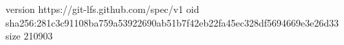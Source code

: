 version https://git-lfs.github.com/spec/v1
oid sha256:281c3c91108ba759a53922690ab51b7f42eb22fa45ec328df5694669e3e26d33
size 210903
